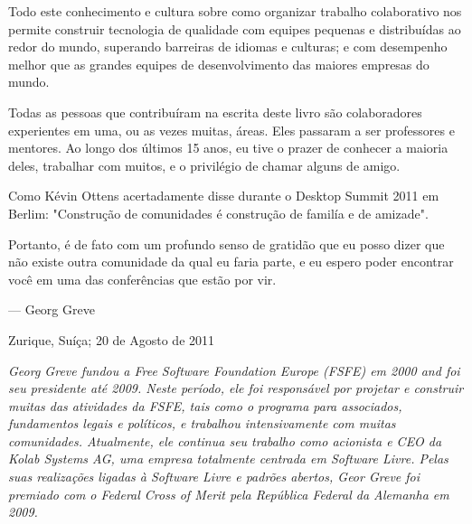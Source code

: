 Todo este conhecimento e cultura sobre como organizar trabalho colaborativo
nos permite construir tecnologia de qualidade com equipes pequenas e
distribuídas ao redor do mundo, superando barreiras de idiomas e culturas;
e com desempenho melhor que as grandes equipes de desenvolvimento das
maiores empresas do mundo.

Todas as pessoas que contribuíram na escrita deste livro são colaboradores
experientes em uma, ou as vezes muitas, áreas. Eles passaram a ser professores
e mentores. Ao longo dos últimos 15 anos, eu tive o prazer de conhecer a
maioria deles, trabalhar com muitos, e o privilégio de chamar alguns de
amigo.

Como Kévin Ottens acertadamente disse durante o Desktop Summit 2011 em
Berlim: "Construção de comunidades é construção de familía e de amizade".

Portanto, é de fato com um profundo senso de gratidão que eu posso dizer
que não existe outra comunidade da qual eu faria parte, e eu espero
poder encontrar você em uma das conferências que estão por vir.
\newline
\begin{flushright}--- Georg Greve\end{flushright}
\begin{flushright}Zurique, Suíça; 20 de Agosto de 2011\end{flushright}

\textit{Georg Greve fundou a Free Software Foundation Europe (FSFE) em
2000 and foi seu presidente até 2009. Neste período, ele foi responsável
por projetar e construir muitas das atividades da FSFE, tais como o
programa para associados, fundamentos legais e políticos, e trabalhou
intensivamente com muitas comunidades. Atualmente, ele continua seu
trabalho como acionista e CEO da Kolab Systems AG, uma empresa totalmente
centrada em Software Livre. Pelas suas realizações ligadas
à Software Livre e padrões abertos, Geor Greve foi premiado com o
Federal Cross of Merit pela República Federal da Alemanha em 2009.}

\newpage
